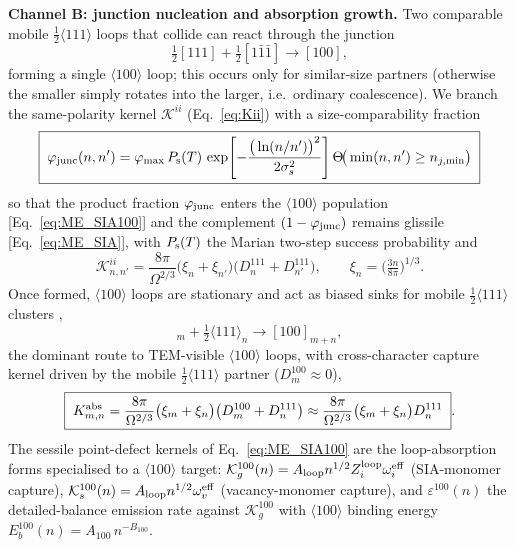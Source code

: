 \textbf{Channel B: junction nucleation and absorption growth.}
\label{sec:channel-B}
Two comparable mobile $\tfrac12\langle111\rangle$ loops that collide can react
through the junction \citep{EyreBullough1965,Marian2002}
\begin{equation}
  \tfrac12[111] + \tfrac12[1\bar1\bar1] \rightarrow [100],
  \label{eq:junction}
\end{equation}
forming a single $\langle100\rangle$ loop; this occurs only for similar-size
partners (otherwise the smaller simply rotates into the larger, i.e.\ ordinary
coalescence). We branch the same-polarity kernel $\mathcal{K}^{ii}$
(Eq.~\ref{eq:Kii}) with a size-comparability fraction
\begin{equation}
  \boxed{\;\varphi_{\rm junc}(n,n') = \varphi_{\max}\,P_{\rm s}(T)\,
  \exp\!\left[-\frac{\big(\ln(n/n')\big)^2}{2\sigma_s^2}\right]
  \Theta\!\big(\min(n,n')\ge n_{j,\min}\big)\;}
  \label{eq:phi-junc}
\end{equation}
so that the product fraction $\varphi_{\rm junc}$ enters the $\langle100\rangle$
population [Eq.~\eqref{eq:ME_SIA100}] and the complement $(1-\varphi_{\rm junc})$
remains glissile [Eq.~\eqref{eq:ME_SIA}], with $P_{\rm s}(T)$ the Marian
two-step success probability and
\begin{equation}
  \mathcal K^{ii}_{n,n'} = \frac{8\pi}{\Omega^{2/3}}
  \big(\xi_n+\xi_{n'}\big)\big(D^{111}_n+D^{111}_{n'}\big),\qquad
  \xi_n=\Big(\tfrac{3n}{8\pi}\Big)^{1/3}.
  \label{eq:Kii}
\end{equation}
Once formed, $\langle100\rangle$ loops are stationary and act as biased sinks
for mobile $\tfrac12\langle111\rangle$ clusters \citep{Marian2002},
\begin{equation}
  [100]_m + \tfrac12\langle111\rangle_n \rightarrow [100]_{m+n},
  \label{eq:absorption}
\end{equation}
the dominant route to TEM-visible $\langle100\rangle$ loops, with cross-character
capture kernel driven by the mobile $\tfrac12\langle111\rangle$ partner
($D^{100}_m\approx0$),
\begin{equation}
  \boxed{\;K^{\rm abs}_{m,n} = \frac{8\pi}{\Omega^{2/3}}
  \big(\xi_m+\xi_n\big)\big(D^{100}_m+D^{111}_n\big)
  \approx \frac{8\pi}{\Omega^{2/3}}\big(\xi_m+\xi_n\big)D^{111}_n\;}.
  \label{eq:Kabs}
\end{equation}
The sessile point-defect kernels of Eq.~\eqref{eq:ME_SIA100} are the
loop-absorption forms specialised to a $\langle100\rangle$ target:
$\mathcal{K}^{100}_g(n)=A_{\rm loop}n^{1/2}Z_i^{\rm loop}\omega_i^{\rm eff}$
(SIA-monomer capture), $\mathcal{K}^{100}_s(n)=A_{\rm loop}n^{1/2}\omega_v^{\rm eff}$
(vacancy-monomer capture), and $\varepsilon^{100}(n)$ the detailed-balance
emission rate against $\mathcal{K}^{100}_g$ with $\langle100\rangle$ binding
energy $E_b^{100}(n)=A_{100}\,n^{-B_{100}}$.

